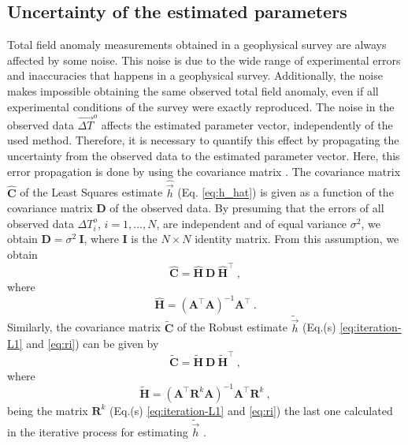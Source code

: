 \documentclass[journal abbreviation, npg]{copernicus}
\begin{document}
\subsection{Uncertainty of the estimated parameters}

Total field anomaly measurements obtained in a geophysical survey are always affected by some noise. This noise is due to the wide range of experimental errors and inaccuracies that happens in a geophysical survey. Additionally, the noise makes impossible obtaining the same observed total field anomaly, even if all experimental conditions of the survey were exactly reproduced. The noise in the observed data $\vec{\Delta T}^{o}$ affects the estimated parameter vector, independently of the used method. Therefore, it is necessary to quantify this effect by propagating the uncertainty from the observed data to the estimated parameter vector. Here, this error propagation is done by using the covariance matrix \citep{bard1973, aster-etal2005}. The covariance matrix $\hat{\mathbf{C}}$ of the Least Squares estimate $\hat{\vec{h}}$ (Eq. \ref{eq:h_hat}) is given as a function of the covariance matrix $\mathbf{D}$ of the observed data. By presuming that 
the errors of all observed data ${\Delta T}^{o}_{i}$, $i = 1, ..., N$, are independent and of equal variance $\sigma^{2}$, we obtain $\mathbf{D} = \sigma^{2} \: \mathbf{I}$, where $\mathbf{I}$ is the $N \times N$ identity matrix. From this assumption, we obtain
\begin{equation}
\hat{\mathbf{C}} = \hat{\mathbf{H}} \: \mathbf{D} \: \hat{\mathbf{H}}^{\intercal} \: ,
\label{eq:cov-h-hat}
\end{equation}
where
\begin{equation}
\hat{\mathbf{H}} = \left( \mathbf{A}^{\intercal}\mathbf{A} \right)^{-1} \mathbf{A}^{\intercal} \: .
\label{eq:H-h-hat}
\end{equation}
Similarly, the covariance matrix $\tilde{\mathbf{C}}$ of the Robust estimate $\tilde{\vec{h}}$ (Eq.(s) \ref{eq:iteration-L1} and \ref{eq:ri}) can be given by
\begin{equation}
\tilde{\mathbf{C}} = \tilde{\mathbf{H}} \: \mathbf{D} \: 
\tilde{\mathbf{H}}^{\intercal} \: ,
\label{eq:cov-h-tilde}
\end{equation}
where
\begin{equation}
\tilde{\mathbf{H}} = \left( \mathbf{A}^{\intercal} \mathbf{R}^{k} \mathbf{A} \right)^{-1}
\mathbf{A}^{\intercal} \mathbf{R}^{k} \: ,
\label{eq:H-h-tilde}
\end{equation}
being the matrix $\mathbf{R}^{k}$ (Eq.(s) \ref{eq:iteration-L1} and \ref{eq:ri}) the last one calculated in the iterative process for estimating $\tilde{\vec{h}}$ \citep{bard1973, aster-etal2005}.
\end{document}
